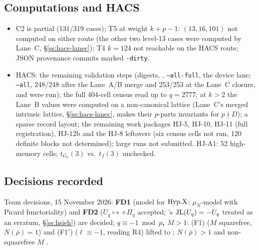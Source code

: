 \subsection{Computations and HACS}
\begin{itemize}
\item C2 is partial (131/319 cases); T5 at weight $k+p-1$: $(13,16,101)$ not computed on either route (the other two level-13 cases were computed by Lane~C,
  \S\ref{ss:hacs-lanec}); T4 $k=124$ not reachable on
  the HACS route; JSON provenance commits marked \texttt{-dirty}.
\item HACS: the remaining validation steps (digests, , \texttt{--all-full}, the device lane; \texttt{--all}, 248/248 after the Lane~A/B merge and 253/253 at the Lane~C closure,
  and  were run); the full 404-cell census read up to $q=2777$; at $k>2$ the Lane~B values were computed on a non-canonical lattice (Lane~C's merged intrinsic lattice,
  \S\ref{ss:hacs-lanec}, makes their $p$-parts invariants for $p\nmid D$); a sparse record layout; the remaining work packages HJ-5, HJ-10, HJ-11 (full registration), HJ-12b and the HJ-8 leftovers (six census cells not
  run, 120 definite blocks not determined); large runs not submitted. HJ-A1: 52 high-memory cells; $t_{G_k}(3)$ vs.\ $t_f(3)$ unchecked.
\end{itemize}

\subsection{Decisions recorded}
Team decisions, 15 November 2026: \textbf{FD1} (model for $\mathrm{Hyp.X}$: $\mu_N$-model with Picard functoriality) and \textbf{FD2}
($U_q\mapsto+\Pi_q$ accepted; \cite{Hs}'s $\mathrm{JL}(U_q)=-U_q$ treated as an erratum, \S\ref{ss:hsieh}) are decided;
\textbf{$q\equiv-1\bmod p$, $M>1$}: (F1) ($M$ squarefree, $N(\bar\rho)=1$) and (F1$'$) ($\ell\equiv-1$, reading R4) lifted to
\stpmc; $N(\bar\rho)>1$ and non-squarefree $M$ \stopen.
